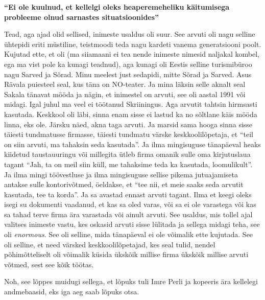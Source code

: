 \textbf{\enquote{Ei ole kuulnud, et kellelgi oleks heaperemeheliku käitumisega 
probleeme olnud sarnastes situatsioonides}}

Tead, aga ajad olid sellised, inimeste usaldus oli suur. See arvuti oli nagu 
selline ühtepidi eriti müstiline, teistmoodi teda nagu kardeti vanema 
generatsiooni poolt. Kujutad ette, et oli (ma siiamaani ei tea nende inimeste 
nimesid naljakal kombel, ega ma vist pole ka kunagi teadnud), aga kunagi oli 
Eestis selline turismibüroo nagu Sarved ja Sõrad. Minu 
meelest just sedapidi, mitte Sõrad ja Sarved. Asus Rävala puiesteel seal, kus 
täna on NO-teater. Ja mina läksin selle aknalt seal Sakala 
tänavat mööda ja nägin, et inimestel on 
arvuti, see oli aastal 1991 või midagi. Igal juhul ma veel ei töötanud 
Skriiningus. Aga arvutit tahtsin hirmsasti kasutada. Keskkool 
oli läbi, sinna enam sisse ei lastud ka no sõltlane käis mööda linna, eks ole. 
Järsku näed, akna taga arvuti. Ja marsid sama hooga sinna sisse täiesti 
tundmatusse firmasse, täiesti tundmatu värske keskkoolilõpetaja, et 
\enquote{teil on siin arvuti, ma tahaksin seda kasutada}. Ja ilma mingisuguse 
tänapäeval heaks kiidetud taustauuringu või millegita ütleb firma omanik sulle 
oma kirjutuslaua tagant \enquote{Jah, ta on meil siin küll, me tahaksime teda ka 
kasutada, loomulikult}. Ja ilma mingi töövestluse ja ilma mingisuguse sellise 
pikema jutuajamiseta antakse sulle kontorivõtmed, öeldakse, et \enquote{tee 
nii, et meie saaks seda arvutit kasutada, tee ta korda}. Ja sa avastad ennast  
arvuti tagant. Ilma et keegi oleks isegi su dokumenti vaadanud, et kas sa oled 
varas, või sa ei ole varastega või kas sa tahad terve firma ära varastada või 
ainult arvuti. See usaldus, mis tollel ajal valitses inimeste vastu, kes 
oskasid arvuti sisse lülitada ja sellega midagi teha, see oli \emph{enormous}. 
See oli selline, mida tänapäeval ei ole võimalik ette kujutada. See oli 
selline, et need värsked keskkoolilõpetajad, kes seal tulid, nendel 
põhimõtteliselt oli võimalik küsida ükskõik millise firma ükskõik millise  
arvuti võtmed, sest see kõik töötas. 

Noh, see lõppes muidugi sellega, et lõpuks tuli Imre Perli ja kopeeris ära kellelegi andmebaasid, eks iga 
aeg saab lõpuks otsa. 


